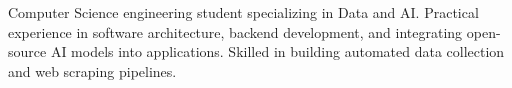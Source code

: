 

\begin{cvparagraph}

Computer Science engineering student specializing in Data and AI. Practical experience in software architecture, backend development, and integrating open-source AI models into applications. Skilled in building automated data collection and web scraping pipelines.\end{cvparagraph}
